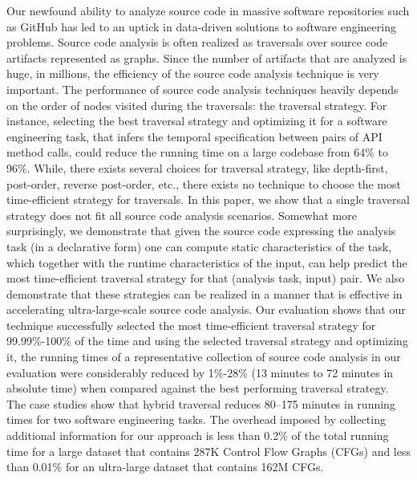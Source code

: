Our newfound ability to analyze source code in massive software
repositories such as GitHub has led to an uptick in data-driven
solutions to software engineering problems. Source code analysis is
often realized as traversals over source code artifacts represented as
graphs. Since the number of artifacts that are analyzed is huge, in
millions, the efficiency of the source code analysis technique is very
important. The performance of source code analysis techniques heavily
depends on the order of nodes visited during the traversals: the
traversal strategy. For instance, selecting the best traversal strategy and optimizing it for a software engineering task, that infers the temporal specification between pairs of API method calls, could reduce the running time on a large codebase from 64\% to 96\%. 
While, there exists several choices for traversal strategy, like depth-first, post-order, reverse post-order, etc., there exists no technique to choose the most time-efficient strategy for traversals. In this paper, we show that a single traversal strategy does not fit all source code analysis scenarios. Somewhat more
surprisingly, we demonstrate that given the source code expressing the
analysis task (in a declarative form) one can compute static
characteristics of the task, which together with the runtime
characteristics of the input, can help predict the most time-efficient
traversal strategy for that (analysis task, input) pair. We also
demonstrate that these strategies can be realized in a manner that is
effective in accelerating ultra-large-scale source code analysis. Our
evaluation shows that our technique successfully selected the most
time-efficient traversal strategy for 99.99\%-100\% of the time and
using the selected traversal strategy and optimizing it, the running times of a
representative collection of source code analysis in our evaluation
were considerably reduced by 1\%-28\% (13 minutes to 72 minutes in absolute time) when compared against the best performing traversal strategy. The case studies show that hybrid traversal reduces 80--175 minutes in running times for two software engineering tasks. The overhead imposed by
collecting additional information for our approach is less than
0.2\% of the total running time for a large dataset that contains 287K
Control Flow Graphs (CFGs) and less than 0.01\% for an ultra-large
dataset that contains 162M CFGs.